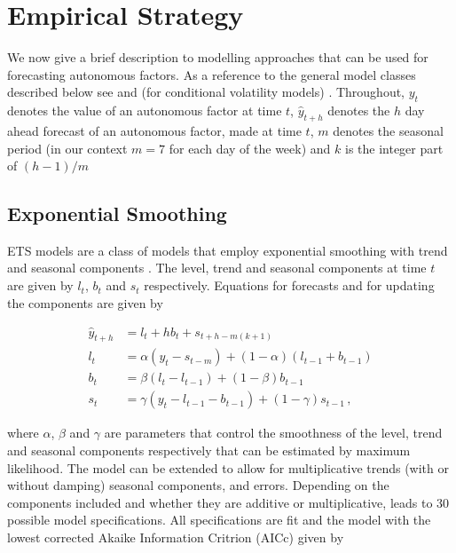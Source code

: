 \section{Empirical Strategy}
\label{sec:empiricalstrategy}


We now give a brief description to modelling approaches that can be used for forecasting autonomous factors. As a reference to the general model classes described below see \cite{HynAth2021} and (for conditional volatility models) \citet{Tsay2005}. Throughout, $y_t$ denotes the value of an autonomous factor at time $t$, $\hat{y}_{t+h}$ denotes the $h$ day ahead forecast of an autonomous factor, made at time $t$, $m$ denotes the seasonal period (in our context $m=7$ for each day of the week) and $k$ is the integer part of $(h-1)/m$



\subsection{Exponential Smoothing}

ETS models are a class of models that employ exponential smoothing with trend and seasonal components \citep[see][for details]{HynEtAl2008}. The level, trend and seasonal components at time $t$ are given by $l_t$, $b_t$ and $s_t$ respectively. Equations for forecasts and for updating the components are given by

\begin{align}
\hat{y}_{t+h}&=l_t+hb_t+s_{t+h-m(k+1)}\\
l_t&=\alpha (y_t-s_{t-m})+(1-\alpha)(l_{t-1}+{b_{t-1}})\\
b_t&=\beta (l_t-l_{t-1})+(1-\beta)b_{t-1}\\
s_t&=\gamma (y_t-l_{t-1}-b_{t-1})+(1-\gamma)s_{t-1}\,,
\end{align}

where $\alpha$, $\beta$ and $\gamma$ are parameters that control the smoothness of the level, trend and seasonal components respectively that can be estimated by maximum likelihood. The model can be extended to allow for  multiplicative trends (with or without damping) seasonal components, and errors. Depending on the components included and whether they are additive or multiplicative, leads to 30 possible model specifications. All specifications are fit and the model with the lowest corrected Akaike Information Critrion (AICc) given by

